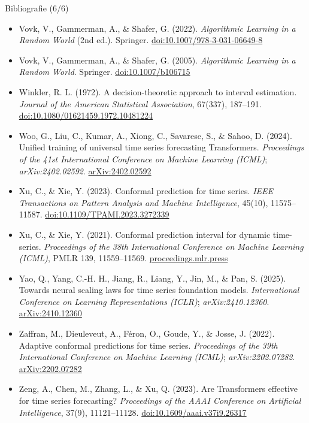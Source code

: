 \begin{frame}{Bibliografie (6/6)}
\itemsize{\tiny}
\begin{itemize}
    \item Vovk, V., Gammerman, A., \& Shafer, G. (2022). \textit{Algorithmic Learning in a Random World} (2nd ed.). Springer. \href{https://doi.org/10.1007/978-3-031-06649-8}{doi:10.1007/978-3-031-06649-8}
    \item Vovk, V., Gammerman, A., \& Shafer, G. (2005). \textit{Algorithmic Learning in a Random World}. Springer. \href{https://doi.org/10.1007/b106715}{doi:10.1007/b106715}
    \item Winkler, R. L. (1972). A decision-theoretic approach to interval estimation. \textit{Journal of the American Statistical Association}, 67(337), 187--191. \href{https://doi.org/10.1080/01621459.1972.10481224}{doi:10.1080/01621459.1972.10481224}
    \item Woo, G., Liu, C., Kumar, A., Xiong, C., Savarese, S., \& Sahoo, D. (2024). Unified training of universal time series forecasting Transformers. \textit{Proceedings of the 41st International Conference on Machine Learning (ICML)}; \textit{arXiv:2402.02592}. \href{https://arxiv.org/abs/2402.02592}{arXiv:2402.02592}
    \item Xu, C., \& Xie, Y. (2023). Conformal prediction for time series. \textit{IEEE Transactions on Pattern Analysis and Machine Intelligence}, 45(10), 11575--11587. \href{https://doi.org/10.1109/TPAMI.2023.3272339}{doi:10.1109/TPAMI.2023.3272339}
    \item Xu, C., \& Xie, Y. (2021). Conformal prediction interval for dynamic time-series. \textit{Proceedings of the 38th International Conference on Machine Learning (ICML)}, PMLR 139, 11559--11569. \href{https://proceedings.mlr.press/v139/xu21h.html}{proceedings.mlr.press}
    \item Yao, Q., Yang, C.-H. H., Jiang, R., Liang, Y., Jin, M., \& Pan, S. (2025). Towards neural scaling laws for time series foundation models. \textit{International Conference on Learning Representations (ICLR)}; \textit{arXiv:2410.12360}. \href{https://arxiv.org/abs/2410.12360}{arXiv:2410.12360}
    \item Zaffran, M., Dieuleveut, A., Féron, O., Goude, Y., \& Josse, J. (2022). Adaptive conformal predictions for time series. \textit{Proceedings of the 39th International Conference on Machine Learning (ICML)}; \textit{arXiv:2202.07282}. \href{https://arxiv.org/abs/2202.07282}{arXiv:2202.07282}
    \item Zeng, A., Chen, M., Zhang, L., \& Xu, Q. (2023). Are Transformers effective for time series forecasting? \textit{Proceedings of the AAAI Conference on Artificial Intelligence}, 37(9), 11121--11128. \href{https://doi.org/10.1609/aaai.v37i9.26317}{doi:10.1609/aaai.v37i9.26317}

\end{itemize}
\end{frame}
